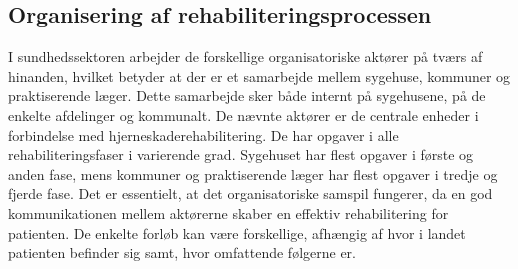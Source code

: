 \subsection{Organisering af rehabiliteringsprocessen}
I sundhedssektoren arbejder de forskellige organisatoriske aktører på tværs af hinanden, hvilket betyder at der er et samarbejde mellem sygehuse, kommuner og praktiserende læger. Dette samarbejde sker både internt på sygehusene, på de enkelte afdelinger og kommunalt. \cite{Sundhedsstyrelsen2010}
De nævnte aktører er de centrale enheder i forbindelse med hjerneskaderehabilitering. De har opgaver i alle rehabiliteringsfaser i varierende grad. Sygehuset har flest opgaver i første og anden fase, mens kommuner og praktiserende læger har flest opgaver i tredje og fjerde fase. \cite{Sundhedsstyrelsen2011a}
Det er essentielt, at det organisatoriske samspil fungerer, da en god kommunikationen mellem aktørerne skaber en effektiv rehabilitering for patienten. De enkelte forløb kan være forskellige, afhængig af hvor i landet patienten befinder sig samt, hvor omfattende følgerne er. \cite{Sundhedsstyrelsen2010}





